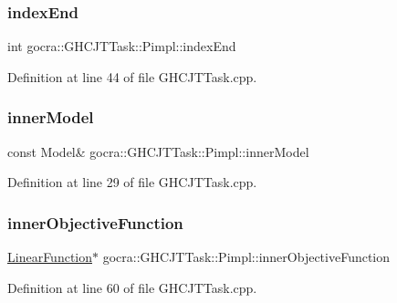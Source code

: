 \subsubsection{\texorpdfstring{index\+End}{indexEnd}}
{\footnotesize\ttfamily int gocra\+::\+G\+H\+C\+J\+T\+Task\+::\+Pimpl\+::index\+End}



Definition at line 44 of file G\+H\+C\+J\+T\+Task.\+cpp.

\hypertarget{structgocra_1_1GHCJTTask_1_1Pimpl_a7f03506d78950aa1a986d2ba44142f28}{}\label{structgocra_1_1GHCJTTask_1_1Pimpl_a7f03506d78950aa1a986d2ba44142f28} 
\subsubsection{\texorpdfstring{inner\+Model}{innerModel}}
{\footnotesize\ttfamily const Model\& gocra\+::\+G\+H\+C\+J\+T\+Task\+::\+Pimpl\+::inner\+Model}



Definition at line 29 of file G\+H\+C\+J\+T\+Task.\+cpp.

\hypertarget{structgocra_1_1GHCJTTask_1_1Pimpl_a1faaaea4991fa4a0bec914732c189fd3}{}\label{structgocra_1_1GHCJTTask_1_1Pimpl_a1faaaea4991fa4a0bec914732c189fd3} 
\subsubsection{\texorpdfstring{inner\+Objective\+Function}{innerObjectiveFunction}}
{\footnotesize\ttfamily \hyperlink{classocra_1_1LinearFunction}{Linear\+Function}$\ast$ gocra\+::\+G\+H\+C\+J\+T\+Task\+::\+Pimpl\+::inner\+Objective\+Function}



Definition at line 60 of file G\+H\+C\+J\+T\+Task.\+cpp.

\hypertarget{structgocra_1_1GHCJTTask_1_1Pimpl_aca6261d2f483c550e6e71c4d31b7c0c1}{}\label{structgocra_1_1GHCJTTask_1_1Pimpl_aca6261d2f483c550e6e71c4d31b7c0c1} 
